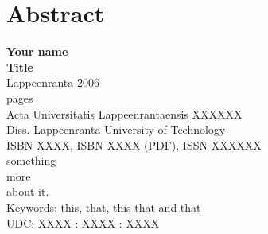 \section*{Abstract}

\textbf{Your name}\\
\textbf{Title}\\
Lappeenranta 2006\\
\pageref{LastPage} pages\\
Acta Universitatis Lappeenrantaensis XXXXXX\\
Diss. Lappeenranta University of Technology\\
ISBN XXXX, ISBN XXXX (PDF), ISSN XXXXXX\\

something\\

more\\

about it.\\

Keywords: this, that, this that and that\\
UDC: XXXX : XXXX : XXXX\\
